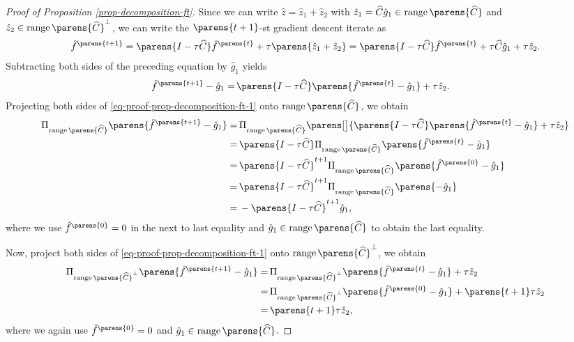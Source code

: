 \begin{proof}[Proof of Proposition \ref{prop-decomposition-ft}]
	Since we can write $\hat{z} = \hat{z}_1 + \hat{z}_2$ with $\hat{z}_1 = \widehat{C} \hat{g}_1 \in \range \parens{\widehat{C}}$ and $\hat{z}_2 \in \range \parens{\widehat{C}}^{\perp}$, we can write the $\parens{t+1}$-st gradient descent iterate as 
	\begin{align*}
		\hat{f}^{\parens{t+1}} = \parens{I - \tau \widehat{C}} \hat{f}^{\parens{t}} + \tau \parens{\hat{z}_1 + \hat{z}_2} = \parens{I - \tau \widehat{C}} \hat{f}^{\parens{t}} + \tau \widehat{C} \hat{g}_1 + \tau \hat{z}_2. 
	\end{align*}
	Subtracting both sides of the preceding equation by $\hat{g}_1$ yields 
	\begin{align}
		\hat{f}^{\parens{t+1}} - \hat{g}_1 %
		= & \, \parens{I - \tau \widehat{C}} \parens{\hat{f}^{\parens{t}} - \hat{g}_1} + \tau \hat{z}_2. \label{eq-proof-prop-decomposition-ft-1}
	\end{align}
	Projecting both sides of \eqref{eq-proof-prop-decomposition-ft-1} onto $\range \parens{\widehat{C}}$, we obtain 
	\begin{align*}
		\Pi_{\range \parens{\widehat{C}}} \parens{\hat{f}^{\parens{t+1}} - \hat{g}_1} = & \, \Pi_{\range \parens{\widehat{C}}} \parens[\big]{ \parens{I - \tau \widehat{C}} \parens{\hat{f}^{\parens{t}} - \hat{g}_1} + \tau \hat{z}_2} \nonumber \\
		= & \, \parens{I - \tau \widehat{C}} \Pi_{\range \parens{\widehat{C}}} \parens{\hat{f}^{\parens{t}} - \hat{g}_1} \\ 
		= & \, \parens{I - \tau \widehat{C}}^{t+1} \Pi_{\range \parens{\widehat{C}}} \parens{\hat{f}^{\parens{0}} - \hat{g}_1} \\ 
		= & \, \parens{I - \tau \widehat{C}}^{t+1} \Pi_{\range \parens{\widehat{C}}} \parens{- \hat{g}_1} \\ 
		= & \, - \parens{I - \tau \widehat{C}}^{t+1} \hat{g}_1, 
	\end{align*}
	where we use $\hat{f}^{\parens{0}} = 0$ in the next to last equality and $\hat{g}_1 \in \range \parens{\widehat{C}}$ to obtain the last equality. 
	
	Now, project both sides of \eqref{eq-proof-prop-decomposition-ft-1} onto $\range \parens{\widehat{C}}^{\perp}$, we obtain 
	\begin{align*}
		\Pi_{\range \parens{\widehat{C}}^{\perp}} \parens{\hat{f}^{\parens{t+1}} - \hat{g}_1} = & \, \Pi_{\range \parens{\widehat{C}}^{\perp}} \parens{\hat{f}^{\parens{t}} - \hat{g}_1} + \tau \hat{z}_2 \\ 
		= & \, \Pi_{\range \parens{\widehat{C}}^{\perp}} \parens{\hat{f}^{\parens{0}} - \hat{g}_1} + \parens{t+1} \tau \hat{z}_2 \\
		= & \, \parens{t+1} \tau \hat{z}_2, 
	\end{align*}
	where we again use $\hat{f}^{\parens{0}} = 0$ and $\hat{g}_1 \in \range \parens{\widehat{C}}$. 
	

\end{proof}
